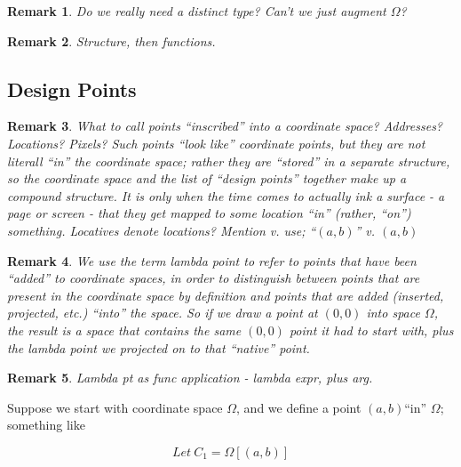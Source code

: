 \documentclass[12pt]{tufte-handout}
\numberwithin{equation}{subsection}
\numberwithin{equation}{subsection}
\newtheorem{remark}{Remark}
\newcommand\cspace{coordinate space}
\newcommand\Omg{\(\Omega\)}
\newcommand\origin{\((0,0)\)}
\newcommand\ab{\((a,b)\)}
\begin{document}
  \begin{remark}
    Do we really need a distinct type?  Can't we just augment \Omg?
  \end{remark}

  \begin{remark}
    Structure, then functions.
  \end{remark}

  \subsection{Design Points}
  \label{sect:dpts}

  \begin{remark}
    What to call points ``inscribed'' into a \cspace{}?  Addresses?
    Locations?  Pixels?  Such points ``look like'' coordinate points,
    but they are not literall ``in'' the \cspace{}; rather they are
    ``stored'' in a separate structure, so the \cspace{} and the list
    of ``design points'' together make up a compound structure.  It is
    only when the time comes to actually ink a surface - a page or
    screen - that they get mapped to some location ``in'' (rather,
    ``on'') something.  Locatives denote locations?  Mention v. use;
    ``\((a,b)\)'' v. \((a,b)\)
  \end{remark}

  \begin{remark}
    We use the term \textit{lambda point} to refer to points that have
    been ``added'' to \cspace{}s, in order to distinguish between points
    that are present in the \cspace{} by definition and points that are
    added (inserted, projected, etc.) ``into'' the space.  So if we draw
    a point at \origin{} into space \Omg{}, the result is a space that
    contains the same \origin{} point it had to start with, plus the
    lambda point we projected on to that ``native'' point.
  \end{remark}

  \begin{remark}
    Lambda pt as func application - lambda expr, plus arg.
  \end{remark}

  Suppose we start with \cspace{} \Omg{}, and we define a point \ab ``in''
  \Omg{}; something like

  \begin{equation}
    \label{eq:omgapplic}
    Let\ C_1 = \Omega[(a,b)]
  \end{equation}
\end{document}
